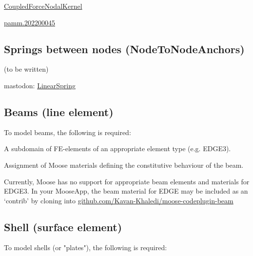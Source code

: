 \href{https://mooseframework.inl.gov/source/nodalkernels/CoupledForceNodalKernel.html}{CoupledForceNodalKernel}

\href{https://onlinelibrary.wiley.com/doi/pdf/10.1002/pamm.202200045}{pamm.202200045}

\subsection{Springs between nodes (NodeToNodeAnchors)}
\label{chap:entities-springs}

(to be written)

mastodon:
\href{https://mooseframework.inl.gov/mastodon/source/materials/LinearSpring.html}{LinearSpring}

\subsection{Beams (line element)}
\label{chap:entities-beams}

To model beams, the following is required:

\begin{description}[font=$\bullet$~\normalfont]
  \item [subdomain:] A subdomain of FE-elements of an appropriate element type (e.g. EDGE3).
  \item [materials:] Assignment of Moose materials defining the constitutive behaviour of the beam.
\end{description}

Currently, Moose has no support for appropriate beam elements and materials for
EDGE3. In your MooseApp, the beam material for EDGE may be included as an
‘contrib’ by cloning into
\href{https://github.com/Kavan-Khaledi/moose-codeplugin-beam}{github.com/Kavan-Khaledi/moose-codeplugin-beam}


\subsection{Shell (surface element)}
\label{chap:entities-shell}

To model shells (or "plates"), the following is required:

